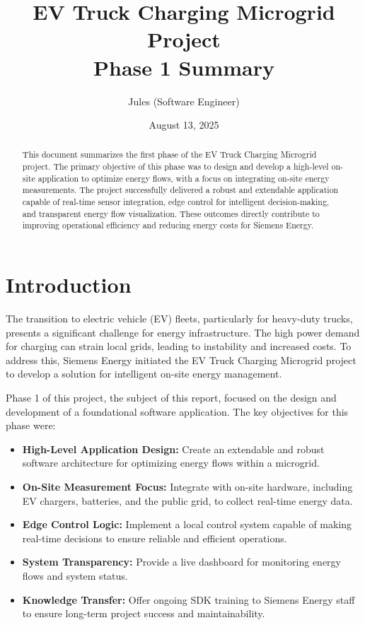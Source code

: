 \documentclass{article}
\title{EV Truck Charging Microgrid Project \\ Phase 1 Summary}
\author{Jules (Software Engineer)}
\date{August 13, 2025}
\begin{document}
\maketitle

\begin{abstract}
This document summarizes the first phase of the EV Truck Charging Microgrid project. The primary objective of this phase was to design and develop a high-level on-site application to optimize energy flows, with a focus on integrating on-site energy measurements. The project successfully delivered a robust and extendable application capable of real-time sensor integration, edge control for intelligent decision-making, and transparent energy flow visualization. These outcomes directly contribute to improving operational efficiency and reducing energy costs for Siemens Energy.
\end{abstract}

\tableofcontents
\newpage

\section{Introduction}
The transition to electric vehicle (EV) fleets, particularly for heavy-duty trucks, presents a significant challenge for energy infrastructure. The high power demand for charging can strain local grids, leading to instability and increased costs. To address this, Siemens Energy initiated the EV Truck Charging Microgrid project to develop a solution for intelligent on-site energy management.

Phase 1 of this project, the subject of this report, focused on the design and development of a foundational software application. The key objectives for this phase were:
\begin{itemize}
    \item \textbf{High-Level Application Design:} Create an extendable and robust software architecture for optimizing energy flows within a microgrid.
    \item \textbf{On-Site Measurement Focus:} Integrate with on-site hardware, including EV chargers, batteries, and the public grid, to collect real-time energy data.
    \item \textbf{Edge Control Logic:} Implement a local control system capable of making real-time decisions to ensure reliable and efficient operations.
    \item \textbf{System Transparency:} Provide a live dashboard for monitoring energy flows and system status.
    \item \textbf{Knowledge Transfer:} Offer ongoing SDK training to Siemens Energy staff to ensure long-term project success and maintainability.
\end{itemize}
\end{document}
